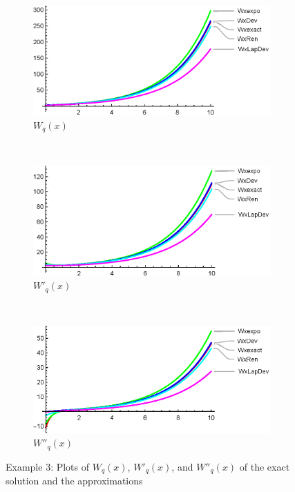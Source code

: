 \begin{figure}
    \centering
    \begin{subfigure}[b]{0.4\textwidth}
        \includegraphics[width=\textwidth]{Wsample3}
        \caption{$W_q(x)$}
        \label{fig:Wsample3}
    \end{subfigure}
    ~ %
    \begin{subfigure}[b]{0.4\textwidth}
        \includegraphics[width=\textwidth]{W1sample3}
        \caption{$W'_q(x)$}
        \label{fig:W1sample3}
    \end{subfigure}
    ~ %
    \\
    \begin{subfigure}[b]{0.9\textwidth}
        \includegraphics[width=\textwidth]{W2sample3}
        \caption{$W''_q(x)$}
        \label{fig:W2sample3}
    \end{subfigure}
    \caption{Example 3: Plots of $W_q(x)$, $W'_q(x)$, and $W''_q(x)$ of the exact solution and the approximations}\label{fig:sample1}
\end{figure}

